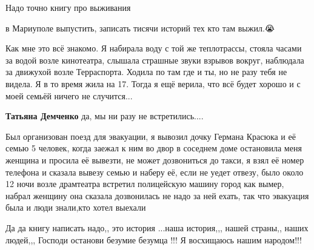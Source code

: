 
 
 
 
 

\qqSecCmt


Надо точно книгу про выживания

в Мариуполе выпустить, записать тисячи историй тех кто там выжил.😭


Как мне это всё знакомо. Я набирала воду с той же теплотрассы, стояла часами за
водой возле кинотеатра, слышала страшные звуки взрывов вокруг, наблюдала за
движухой возле Терраспорта. Ходила по там где и ты, но не разу тебя не видела.
Я в то время жила на 17. Тогда я ещё верила, что всё будет хорошо и с моей
семьёй ничего не случится...

\begin{itemize} %
\textbf{Татьяна Демченко} да, мы ни разу не встретились....
\end{itemize} %


Был организован поезд для эвакуации, я вывозил дочку Германа Красюка и её семью
5 человек, когда заежал к ним во двор в соседнем доме остановила меня женщина и
просила её вывезти, не может дозвониться до такси, я взял её номер телефона и
сказала вывезу семью и наберу её, если не уедет отвезу, было около 12 ночи
возле драмтеатра встретил полицейскую машину город как вымер, набрал женщину
она сказала дозвонилась не надо за ней ехать, так что эвакуация была и люди
знали,кто хотел выехали


Да да книгу написать надо,, это история ...наша история,,, нашей страны,, наших
людей,,, Господи останови безумие безумца !!! Я восхищаюсь нашим народом!!!
